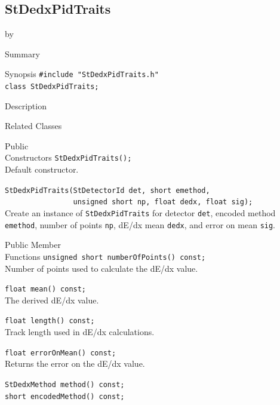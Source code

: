 \documentclass[twoside]{article}
\newcommand{\entrylabel}[1]{\mbox{\textbf{{#1}}}\hfil}%
\newenvironment{entry}
{\begin{list}{}%
    {\renewcommand{\makelabel}{\entrylabel}%
     \setlength{\labelwidth}{90pt}%
     \setlength{\leftmargin}{\labelwidth}
     \advance\leftmargin by \labelsep%
      }%
    }%
  {\end{list}}
\newcommand{\Entrylabel}[1]%
{\raisebox{0pt}[1ex][0pt]{\makebox[\labelwidth][l]%
    {\parbox[t]{\labelwidth}{\hspace{0pt}\textbf{{#1}}}}}}
\newenvironment{Entry}%
{\renewcommand{\entrylabel}{\Entrylabel}\begin{entry}}%
  {\end{entry}}
\begin{document}
\subsection{StDedxPidTraits}
\label{sec:StDedxPidTraits}
\begin{Entry}
\item[Summary]
\item[Synopsis]
    \verb+#include "StDedxPidTraits.h"+\\
    \verb+class StDedxPidTraits;+\\
\item[Description]
\item[Related Classes]
\item[Public\\ Constructors]
    \verb+StDedxPidTraits();+\\
    Default constructor.
    
    \verb+StDedxPidTraits(StDetectorId det, short emethod,+\\
    \verb+                unsigned short np, float dedx, float sig);+\\
    Create an instance of \texttt{StDedxPidTraits} for detector
    \texttt{det}, encoded method \texttt{emethod}, number of points
    \texttt{np}, dE/dx mean \texttt{dedx}, and error on mean \texttt{sig}.
    
\item[Public Member\\ Functions]
    \verb+unsigned short numberOfPoints() const;+\\
    Number of points used to calculate the dE/dx value.
    
    \verb+float mean() const;+\\
    The derived dE/dx value.

    \verb+float length() const;+\\
    Track length used in dE/dx calculations.
    
    \verb+float errorOnMean() const;+\\
    Returns the error on the dE/dx value.
    
    \verb+StDedxMethod method() const;+\\    

    \verb+short encodedMethod() const;+\\
\end{Entry}
\clearpage
\end{document}
